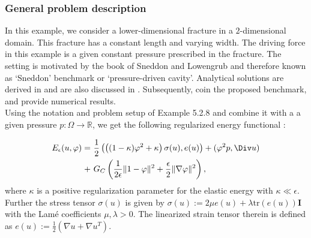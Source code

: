 \subsubsection{General problem description}

In this example, we consider a lower-dimensional fracture in a
  $2$-dimensional domain. This fracture has 
a constant length and varying width.
The driving force in this example is a given constant pressure prescribed in the fracture.
The setting is motivated by the book of Sneddon and Lowengrub
\cite{sneddon1969crack} and therefore known as `Sneddon' benchmark or `pressure-driven cavity'. Analytical solutions are derived in \cite{sneddon1969crack} and are also discussed in 
\cite{bourdin2012variational}. Subsequently, 
\cite{wheeler2014augmented,heister2015primal} coin the proposed benchmark, 
and provide numerical results.\\

Using the notation and problem setup of Example 5.2.8 and combine it with a a given pressure $p:\Omega \to \mathbb{R}$, we get the
following regularized energy functional \cite{MiWheWi19}:

\begin{align*}
\begin{aligned}
 E_{\epsilon}(u,\varphi)=&\ \frac{1}{2}\left(\left((1-\kappa)\varphi^2+\kappa\right) \sigma(u),e(u)\right)+(\varphi^2 p,\Div u)\\ +&\ G_C\left(\frac{1}{2\epsilon}\|1-\varphi\|^2 
 + \frac{\epsilon}{2}\|\nabla\varphi\|^2\right),
\end{aligned}
\end{align*}
where $\kappa$ is a positive regularization parameter for the elastic energy with $\kappa \ll \epsilon$. Further the stress tensor $\sigma(u)$ is given by $\sigma(u) := 2 \mu e(u)+ \lambda \text{tr} (e(u)) \textbf{I}$ 
with the Lam\'e coefficients $\mu,\lambda > 0$.
The linearized strain tensor therein is defined as $e(u):=\frac{1}{2} (\nabla u + \nabla u^T)$.\\


